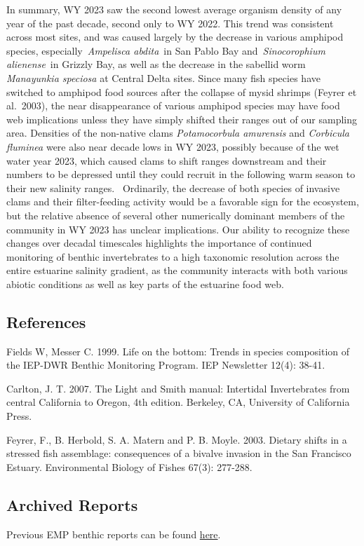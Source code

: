 \documentclass[
]{article}
\begin{document}
In summary, WY 2023 saw the second lowest average organism density of
any year of the past decade, second only to WY 2022. This trend was
consistent across most sites, and was caused largely by the decrease in
various amphipod species, especially~\emph{Ampelisca abdita}~in San
Pablo Bay and~\emph{Sinocorophium alienense}~in Grizzly Bay, as well as
the decrease in the sabellid worm \emph{Manayunkia speciosa} at Central
Delta sites. Since many fish species have switched to amphipod food
sources after the collapse of mysid shrimps (Feyrer et al.~2003), the
near disappearance of various amphipod species may have food web
implications unless they have simply shifted their ranges out of our
sampling area. Densities of the non-native clams \emph{Potamocorbula
amurensis} and \emph{Corbicula fluminea} were also near decade lows in
WY 2023, possibly because of the wet water year 2023, which caused clams
to shift ranges downstream and their numbers to be depressed until they
could recruit in the following warm season to their new salinity
ranges.~ Ordinarily, the decrease of both species of invasive clams and
their filter-feeding activity would be a favorable sign for the
ecosystem, but the relative absence of several other numerically
dominant members of the community in WY 2023 has unclear implications.
Our ability to recognize these changes over decadal timescales
highlights the importance of continued monitoring of benthic
invertebrates to a high taxonomic resolution across the entire estuarine
salinity gradient, as the community interacts with both various abiotic
conditions as well as key parts of the estuarine food web.

\hypertarget{references}{%
\subsection{References}\label{references}}

Fields W, Messer C. 1999. Life on the bottom: Trends in species
composition of the IEP-DWR Benthic Monitoring Program. IEP Newsletter
12(4): 38-41.

Carlton, J. T. 2007. The Light and Smith manual: Intertidal
Invertebrates from central California to Oregon, 4th edition. Berkeley,
CA, University of California Press.

Feyrer, F., B. Herbold, S. A. Matern and P. B. Moyle. 2003. Dietary
shifts in a stressed fish assemblage: consequences of a bivalve invasion
in the San Francisco Estuary. Environmental Biology of Fishes 67(3):
277-288.

\hypertarget{archived-reports}{%
\subsection{Archived Reports}\label{archived-reports}}

Previous EMP benthic reports can be found
\href{https://github.com/emp-dwr/emp-website/tree/gh-pages/admin/archive/benthic}{here}.
\end{document}
